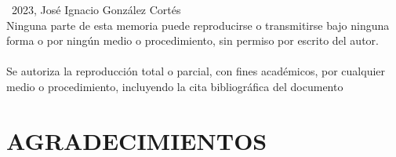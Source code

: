 \documentclass[spanish, a4paper, 12pt, openany,final]{book}
\begin{document}
\thispagestyle{empty}
\mbox{}                         %
\vfill                          %
\textcopyright\ 2023, José Ignacio González Cortés \\ %
Ninguna parte de esta memoria puede reproducirse o transmitirse bajo ninguna forma o por ningún medio o procedimiento, sin permiso por escrito del autor.\\\\
Se autoriza la reproducción total o parcial, con fines académicos, por cualquier medio o procedimiento, incluyendo la cita bibliográfica del documento
\vspace{1cm}    %
\restoregeometry %








\thispagestyle{empty}
\mbox{}
\vfill
\hfill {}

\restoregeometry









\newpage
{}  %
\section*{AGRADECIMIENTOS}                       %
\end{document}
